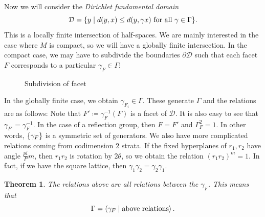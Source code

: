 \documentclass[leqno, openany]{memoir}
\newtheorem{thm}{Theorem}[section]
\theoremstyle{definition}
\theoremstyle{remark}
\theoremstyle{plain}
\theoremstyle{definition}
\theoremstyle{remark}
\newcommand{\mc}[1]{\mathcal{#1}}
\begin{document}
Now we will consider the \textit{Dirichlet fundamental domain}
\[ \mc{D} = \qty{y \mid d(y,x) \leq d(y, \gamma x) \text{ for all } \gamma \in \Gamma}. \]
This is a locally finite intersection of half-spaces. We are mainly interested in the case where $M$ is compact, so we will have a globally finite intersection. In the compact case, we may have to subdivide the boundaries $\partial \mc{D}$ such that each facet $F$ corresponds to a particular $\gamma_F \in \Gamma$:
\begin{figure}[H]
    \centering
    \caption{Subdivision of facet}%
    \label{fig:fd_domain}
\end{figure}
In the globally finite case, we obtain $\gamma_{F_i} \in \Gamma$. These generate $\Gamma$ and the relations are as follows: Note that $F' \coloneqq \gamma_F^{-1}(F)$ is a facet of $\mc{D}$. It is also easy to see that $\gamma_{F'} = \gamma_F^{-1}$. In the case of a reflection group, then $F = F'$ and $\Gamma_F^2 = 1$. In other words, $\qty{\gamma_F}$ is a symmetric set of generators. We also have more complicated relations coming from codimension $2$ strata. If the fixed hyperplanes of $r_1, r_2$ have angle $\frac{pi}Pm$, then $r_1 r_2$ is rotation by $2 \theta$, so we obtain the relation ${(r_1 r_2)}^m = 1$. In fact, if we have the square lattice, then $\gamma_1 \gamma_2 = \gamma_2 \gamma_1$.

\begin{thm}
    The relations above are all relations between the $\gamma_F$. This means that 
    \[ \Gamma = \ev{\gamma_F \mid \text{above relations}}. \]
\end{thm}
\end{document}
